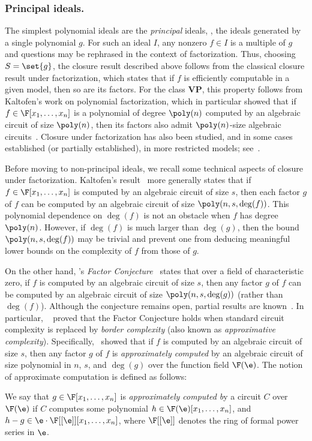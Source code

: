 \documentclass[letterpaper, 11pt]{amsart}
\begin{document}
\subsubsection*{Principal ideals.}  

The simplest polynomial ideals are the \emph{principal} ideals, \ie, the ideals generated by a single polynomial $g$.  
For such an ideal $I$, any nonzero $f \in I$ is a multiple of $g$ and questions may be rephrased in the context of factorization.
Thus, choosing $S = \set{g}$, the closure result described above follows from the classical closure result under factorization, which states that if $f$ is efficiently computable in a given model, then so are its factors.
For the class $\mathbf{VP}$, this property follows from Kaltofen’s work on polynomial factorization, which in particular showed that if $f \in \F[x_1,\dots,x_n]$ is a polynomial of degree $\poly(n)$ computed by an algebraic circuit of size $\poly(n)$, then its factors also admit $\poly(n)$-size algebraic circuits~\cite{Kal86, Kal87, Kal89}.  
Closure under factorization has also been studied, and in some cases established (or partially established), in more restricted models; see~\cite{Oli16,CKS19,BSV20,ST21,DSS22,BKRRSS25}.

Before moving to non-principal ideals, we recall some technical aspects of closure under factorization.
Kaltofen’s result~\cite{Kal86, Kal87, Kal89} more generally states that if $f \in \F[x_1,\dots,x_n]$ is computed by an algebraic circuit of size $s$, then each factor $g$ of $f$ can be computed by an algebraic circuit of size $\poly(n, s, \deg(f))$.  
This polynomial dependence on $\deg(f)$ is not an obstacle when $f$ has degree $\poly(n)$.
However, if $\deg(f)$ is much larger than $\deg(g)$, then the bound $\poly(n, s, \deg(f))$ may be trivial and prevent one from deducing meaningful lower bounds on the complexity of $f$ from those of $g$.  

On the other hand, \Burgisser's \emph{Factor Conjecture}~\cite[Conjecture~8.3]{Bur00} states that over a field of characteristic zero, if $f$ is computed by an algebraic circuit of size $s$, then any factor $g$ of $f$ can be computed by an algebraic circuit of size $\poly(n, s, \deg(g))$ (rather than $\deg(f)$).
Although the conjecture remains open, partial results are known~\cite{Kal86,Bur00,Bur04,DSS22}.
In particular, \Burgisser\ \cite{Bur04} proved that the Factor Conjecture holds when standard circuit complexity is replaced by \emph{border complexity} (also known as \emph{approximative complexity}).
Specifically, \Burgisser\ showed that if $f$ is computed by an algebraic circuit of size $s$, then any factor $g$ of $f$ is \emph{approximately computed} by an algebraic circuit of size polynomial in $n$, $s$, and $\deg(g)$ over the function field $\F(\e)$.
The notion of approximate computation is defined as follows:
\begin{defn}\label{defn:border_complexity}
We say that $g \in \F[x_1,\dots,x_n]$ is \emph{approximately computed b}y a circuit $C$ over $\F(\e)$ if $C$ computes some polynomial $h \in \F(\e)[x_1,\dots,x_n]$, and $h - g \in \e \cdot \F[[\e]][x_1,\dots,x_n]$, where $\F[[\e]]$ denotes the ring of formal power series in $\e$.
\end{defn}
\end{document}
